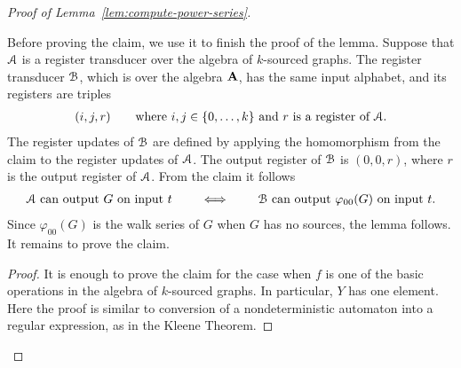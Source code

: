 \begin{proof}[Proof of Lemma~\ref{lem:compute-power-series}]
\begin{claim}
	\end{claim}
	Before proving the claim, we use it to finish the proof of the lemma. Suppose that ${{\mathcal A}}$ is a register transducer over the algebra of $k$-sourced graphs. The register transducer  ${\mathcal B}$, which is over the algebra $\mathbf{A}$, has the same input alphabet, and its registers are triples 
	\begin{align*}
	(i,j,r) \qquad \text{where $i,j \in \{0,\ldots,k\}$ and $r$ is a register of ${{\mathcal A}}$.}
	\end{align*}
	The register updates of ${\mathcal B}$ are defined by applying the homomorphism from the claim  to the register updates of ${{\mathcal A}}$. 
	The output register of ${\mathcal B}$ is $(0,0,r)$, where  $r$ is the output register of ${{\mathcal A}}$.  From the claim it follows 
	\begin{align*}
	\text{${{\mathcal A}}$ can output $G$ on input $t$} \qquad \iff \qquad 
	\text{${\mathcal B}$ can output $\varphi_{00}(G)$ on input $t$}.
	\end{align*}
	Since $\varphi_{00}(G)$ is the walk series of $G$ when $G$ has no sources, the lemma follows. It remains to prove the claim.
	
	\begin{proof} 
		It is enough to prove the claim for the case when $f$ is one of the basic operations in the algebra of $k$-sourced graphs. In particular, $Y$ has one element. Here the proof is similar to conversion of a nondeterministic automaton into a regular expression, as in the Kleene Theorem.
		

\end{proof}
\end{proof}
